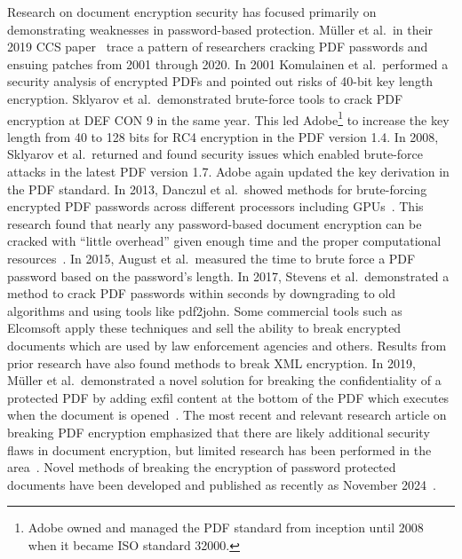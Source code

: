 Research on document encryption security has focused primarily on demonstrating weaknesses in password-based protection. M\"uller et al.\ in their 2019 CCS paper~\cite{muller_practical_2019} trace a pattern of researchers cracking PDF passwords and ensuing patches from 2001 through 2020. In 2001 Komulainen et al.\ performed a security analysis of encrypted PDFs and pointed out risks of 40-bit key length encryption. Sklyarov et al.\ demonstrated brute-force tools to crack PDF encryption at DEF CON 9 in the same year. This led Adobe\footnote{Adobe owned and managed the PDF standard from inception until 2008 when it became ISO standard 32000.} to increase the key length from 40 to 128 bits for RC4 encryption in the PDF version 1.4. In 2008, Sklyarov et al.\ returned and found security issues which enabled brute-force attacks in the latest PDF version 1.7. Adobe again updated the key derivation in the PDF standard. In 2013, Danczul et al.\ showed methods for brute-forcing encrypted PDF passwords across different processors including GPUs~\cite{danczul_cuteforce_2013}. This research found that nearly any password-based document encryption can be cracked with ``little overhead'' given enough time and the proper computational resources~\cite{danczul_cuteforce_2013}. In 2015, August et al.\ measured the time to brute force a PDF password based on the password's length. In 2017, Stevens et al.\ demonstrated a method to crack PDF passwords within seconds by downgrading to old algorithms and using tools like pdf2john. Some commercial tools such as Elcomsoft apply these techniques and sell the ability to break encrypted documents which are used by law enforcement agencies and others. Results from prior research have also found methods to break XML encryption. In 2019, M\"uller et al.\ demonstrated a novel solution for breaking the confidentiality of a protected PDF by adding exfil content at the bottom of the PDF which executes when the document is opened~\cite{muller_practical_2019}. The most recent and relevant research article on breaking PDF encryption emphasized that there are likely additional security flaws in document encryption, but limited research has been performed in the area~\cite{muller_practical_2019}. Novel methods of breaking the encryption of password protected documents have been developed and published as recently as November 2024~\cite{hranicky_experimental_2024}.

